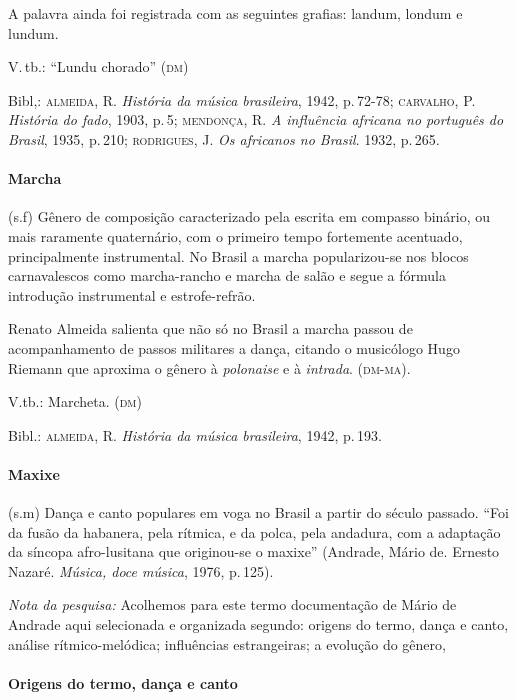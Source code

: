 A palavra ainda foi registrada com as seguintes grafias: landum, londum
e lundum.

V.\,tb.: ``Lundu chorado'' (\textsc{dm})

Bibl,: \textsc{almeida}, R. \textit{História da música brasileira}, 1942, p.\,72-78;
\textsc{carvalho}, P. \textit{História do fado}, 1903, p.\,5; \textsc{mendonça}, R. \textit{A influência
africana no português do Brasil}, 1935, p.\,210; \textsc{rodrigues}, J. \textit{Os africanos
no Brasil}. 1932, p.\,265.

\paragraph{Marcha} (s.f) Gênero de composição caracterizado pela escrita
em compasso binário, ou mais raramente quaternário, com o primeiro tempo
fortemente acentuado, principalmente instrumental. No Brasil a marcha
popularizou-se nos blocos carnavalescos como marcha-rancho e marcha de
salão e segue a fórmula introdução instrumental e estrofe-refrão.

Renato Almeida salienta que não só no Brasil a marcha passou de
acompanhamento de passos militares a dança, citando o musicólogo Hugo
Riemann que aproxima o gênero à \textit{polonaise} e à \textit{intrada}. (\textsc{dm-ma}).

V.tb.: Marcheta. (\textsc{dm})

Bibl.: \textsc{almeida}, R. \textit{História da música brasileira}, 1942, p.\,193.

\paragraph{Maxixe} (s.m) Dança e canto populares em voga no Brasil a
partir do século passado. ``Foi da fusão da habanera, pela rítmica, e da
polca, pela andadura, com a adaptação da síncopa afro-lusitana que
originou-se o maxixe'' (Andrade, Mário de. Ernesto Nazaré. \textit{Música,
doce música}, 1976, p.\,125).

\textit{Nota da pesquisa:} Acolhemos para este termo documentação de Mário
de Andrade aqui selecionada e organizada segundo: origens do termo,
dança e canto, análise rítmico-melódica; influências estrangeiras; a
evolução do gênero,

\paragraph{Origens do termo, dança e canto}

